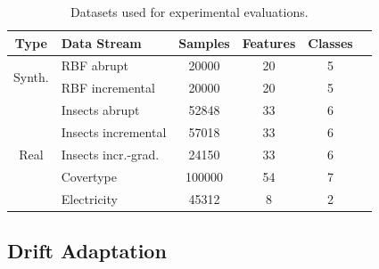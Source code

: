 \documentclass[letterpaper]{article} %
\begin{document}
\begin{table}[ht]
	\small
	\begin{tabular}{@{}clcccc@{}}
		\toprule
		Type                    & Data Stream            & Samples & Features & Classes \\
		\midrule
		\multirow{2}{*}{Synth.} & RBF abrupt             & 20000   & 20       & 5       \\
		                        & RBF incremental        & 20000   & 20       & 5       \\
		\midrule
		\multirow{5}{*}{Real}   & Insects abrupt         & 52848   & 33       & 6       \\
		                        & Insects incremental    & 57018   & 33       & 6       \\
		                        & Insects incr.-grad.    & 24150   & 33       & 6       \\
		                        & Covertype\footnotemark & 100000  & 54       & 7       \\
		                        & Electricity            & 45312   & 8        & 2       \\
		\bottomrule
	\end{tabular}\label{tab:datasets}
	\caption{Datasets used for experimental evaluations.}
\end{table}



\subsection{Drift Adaptation}
\end{document}
